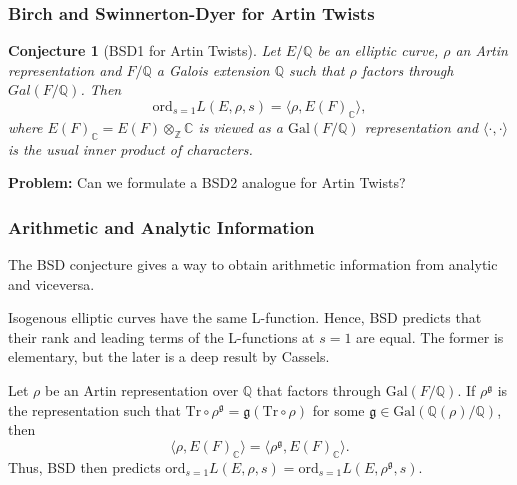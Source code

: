 \documentclass{beamer}
\newcommand{\Gal}{\mathrm{Gal}}
\newcommand{\BSD}{\mathrm{BSD}}
\newcommand{\tors}{\mathrm{tors}}
\newcommand{\Reg}{\mathrm{Reg}}
\newcommand{\Tr}{\mathrm{Tr}}
\newcommand{\ord}{\mathrm{ord}}
\newcommand{\CC}{\mathbb{C}}
\newcommand{\QQ}{\mathbb{Q}}
\newcommand{\ZZ}{\mathbb{Z}}
\theoremstyle{plain}
\newtheorem{conjecture}[thm]{Conjecture}
\begin{document}
\begin{frame}
    \frametitle{Birch and Swinnerton-Dyer for Artin Twists}
    \begin{conjecture}[BSD1 for Artin Twists]
        Let $E/\QQ$ be an elliptic curve, $\rho$ an Artin representation and $F/\QQ$ a Galois extension $\QQ$ such that $\rho$ factors through $Gal(F/\QQ)$. Then
        $$\ord_{s=1}L(E,\rho,s)=\langle\rho,E(F)_\CC\rangle,$$
        where $E(F)_\CC=E(F)\otimes_\ZZ \CC$ is viewed as a $\Gal(F/\QQ)$ representation and $\langle\cdot,\cdot\rangle$ is the usual inner product of characters.
    \end{conjecture}
    \textbf{Problem:} Can we formulate a BSD2 analogue for Artin Twists?
\end{frame}

\begin{frame}
    \frametitle{Arithmetic and Analytic Information}
    The BSD conjecture gives a way to obtain arithmetic information from analytic and viceversa.
    \begin{example}
        Isogenous elliptic curves have the same L-function. Hence, BSD predicts that their rank and leading terms of the L-functions at $s=1$ are equal. The former is elementary, but the later is a deep result by Cassels.
    \end{example}
    \begin{example}
        Let $\rho$ be an Artin representation over $\QQ$ that factors through $\Gal(F/\QQ)$. If $\rho^\mathfrak{g}$ is the representation such that $\Tr\circ \rho^\mathfrak{g}=\mathfrak{g}(\Tr\circ\rho)$ for some $\mathfrak{g}\in\Gal(\QQ(\rho)/\QQ)$, then $$\langle\rho,E(F)_\CC\rangle=\langle\rho^\mathfrak{g},E(F)_\CC\rangle.$$
        Thus, BSD then predicts $\ord_{s=1}L(E,\rho,s)=\ord_{s=1}L(E,\rho^\mathfrak{g},s)$.
    \end{example}
\end{frame}
\end{document}
